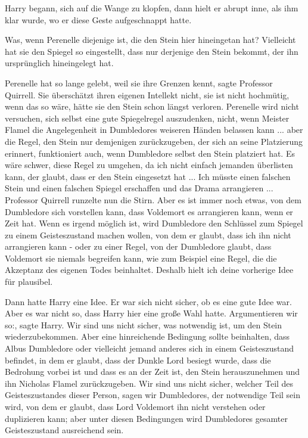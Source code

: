 Harry begann, sich auf die Wange zu klopfen, dann hielt er abrupt inne, als ihm
klar wurde, wo er diese Geste aufgeschnappt hatte.

\glqq{}Was, wenn Perenelle diejenige ist, die den Stein hier hineingetan hat?
Vielleicht hat sie den Spiegel so eingestellt, dass nur derjenige den Stein
bekommt, der ihn ursprünglich hineingelegt hat.\grqq{}

\glqq{}Perenelle hat so lange gelebt, weil sie ihre Grenzen kennt\grqq{}, sagte
Professor Quirrell. \glqq{}Sie überschätzt ihren eigenen Intellekt nicht, sie ist
nicht hochmütig, wenn das so wäre, hätte sie den Stein schon längst verloren.
Perenelle wird nicht versuchen, sich selbst eine gute Spiegelregel auszudenken,
nicht, wenn Meister Flamel die Angelegenheit in Dumbledores weiseren Händen
belassen kann ... aber die Regel, den Stein nur demjenigen zurückzugeben, der
sich an seine Platzierung erinnert, funktioniert auch, wenn Dumbledore selbst
den Stein platziert hat. Es wäre schwer, diese Regel zu umgehen, da ich nicht
einfach jemanden überlisten kann, der glaubt, dass er den Stein eingesetzt
hat ... Ich müsste einen falschen Stein und einen falschen Spiegel erschaffen und
das Drama arrangieren ...\grqq{} Professor Quirrell runzelte nun die Stirn. \glqq{}
Aber es ist immer noch etwas, von dem Dumbledore sich vorstellen kann, dass
Voldemort es arrangieren kann, wenn er Zeit hat. Wenn es irgend möglich ist,
wird Dumbledore den Schlüssel zum Spiegel zu einem Geisteszustand machen wollen,
von dem er glaubt, dass ich ihn nicht arrangieren kann - oder zu einer Regel,
von der Dumbledore glaubt, dass Voldemort sie niemals begreifen kann, wie zum
Beispiel eine Regel, die die Akzeptanz des eigenen Todes beinhaltet. Deshalb
hielt ich deine vorherige Idee für plausibel.\grqq{}

Dann hatte Harry eine Idee. Er war sich nicht sicher, ob es eine gute Idee war.
Aber es war nicht so, dass Harry hier eine große Wahl hatte. \glqq{}Argumentieren
wir so:\grqq{}, sagte Harry. \glqq{}Wir sind uns nicht sicher, was notwendig ist,
um den Stein wiederzubekommen. Aber eine hinreichende Bedingung sollte
beinhalten, dass Albus Dumbledore oder vielleicht jemand anderes sich in einem
Geisteszustand befindet, in dem er glaubt, dass der Dunkle Lord besiegt wurde,
dass die Bedrohung vorbei ist und dass es an der Zeit ist, den Stein
herauszunehmen und ihn Nicholas Flamel zurückzugeben. Wir sind uns nicht sicher,
welcher Teil des Geisteszustandes dieser Person, sagen wir Dumbledores, der
notwendige Teil sein wird, von dem er glaubt, dass Lord Voldemort ihn nicht
verstehen oder duplizieren kann; aber unter diesen Bedingungen wird Dumbledores
gesamter Geisteszustand ausreichend sein.\grqq{}

